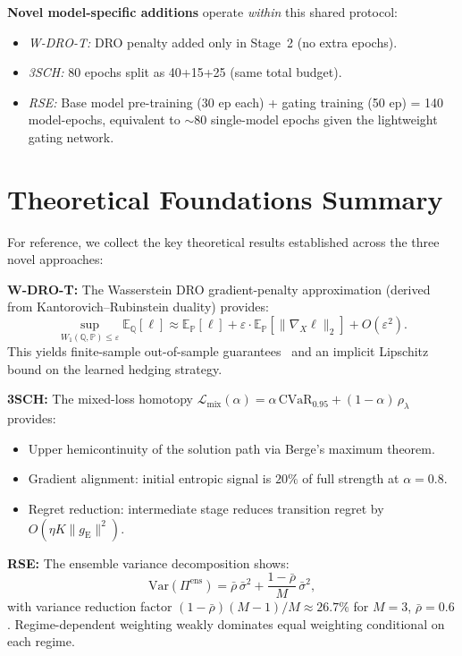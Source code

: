 \documentclass[11pt]{article}
\newcommand{\E}{\mathbb{E}}
\newcommand{\PP}{\mathbb{P}}
\newcommand{\QQ}{\mathbb{Q}}
\newcommand{\cvar}{\mathrm{CVaR}}
\begin{document}
\textbf{Novel model-specific additions} operate \emph{within} this shared protocol:
\begin{itemize}[noitemsep]
    \item \textit{W-DRO-T:} DRO penalty added only in Stage~2 (no extra epochs).
    \item \textit{3SCH:} 80 epochs split as 40+15+25 (same total budget).
    \item \textit{RSE:} Base model pre-training (30 ep each) + gating training (50 ep) = 140 model-epochs, equivalent to $\sim$80 single-model epochs given the lightweight gating network.
\end{itemize}

\section{Theoretical Foundations Summary}
\label{app:theory}

For reference, we collect the key theoretical results established across the three novel approaches:

\textbf{W-DRO-T:} The Wasserstein DRO gradient-penalty approximation (derived from Kantorovich--Rubinstein duality) provides:
\begin{equation}
    \sup_{W_1(\QQ,\PP)\le\varepsilon}\E_\QQ[\ell] \approx \E_\PP[\ell] + \varepsilon\cdot\E_\PP[\|\nabla_X\ell\|_2] + O(\varepsilon^2).
    \tag{W-DRO-T.1}
\end{equation}
This yields finite-sample out-of-sample guarantees~\citep{esfahani2018data} and an implicit Lipschitz bound on the learned hedging strategy.

\textbf{3SCH:} The mixed-loss homotopy $\mathcal{L}_{\mathrm{mix}}(\alpha) = \alpha\,\cvar_{0.95} + (1-\alpha)\,\rho_\lambda$ provides:
\begin{itemize}[noitemsep]
    \item Upper hemicontinuity of the solution path via Berge's maximum theorem.
    \item Gradient alignment: initial entropic signal is $20\%$ of full strength at $\alpha=0.8$.
    \item Regret reduction: intermediate stage reduces transition regret by $O(\eta K\|g_{\mathrm{E}}\|^2)$.
\end{itemize}

\textbf{RSE:} The ensemble variance decomposition shows:
\begin{equation}
    \mathrm{Var}(\Pi^{\mathrm{ens}}) = \bar\rho\,\bar\sigma^2 + \frac{1-\bar\rho}{M}\,\bar\sigma^2,
    \tag{RSE.1}
\end{equation}
with variance reduction factor $(1-\bar\rho)(M-1)/M \approx 26.7\%$ for $M=3$, $\bar\rho=0.6$.  Regime-dependent weighting weakly dominates equal weighting conditional on each regime.
\end{document}
